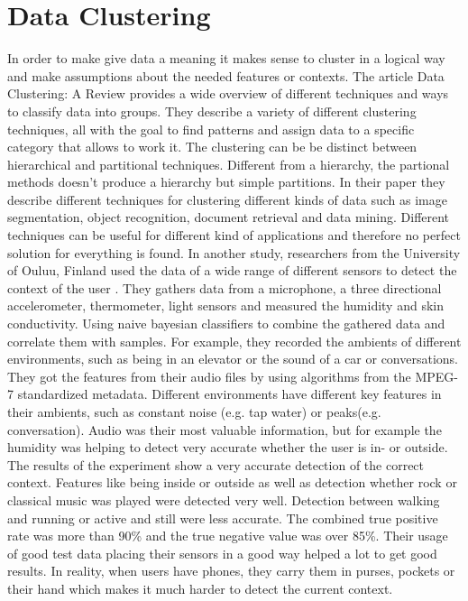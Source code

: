 \section{Data Clustering}
In order to make give data a meaning it makes sense to cluster in a logical way and make assumptions about the needed features or contexts. 
The article Data Clustering: A Review \cite{jain1999data} provides a wide overview of different techniques and ways to classify data into groups. They describe a variety of different clustering techniques, all with the goal to find patterns and assign data to a specific category that allows to work it. The clustering can be be distinct between hierarchical and partitional techniques. Different from a hierarchy, the partional methods doesn't produce a hierarchy but simple partitions. In their paper they describe different techniques for clustering different kinds of data such as image segmentation, object recognition, document retrieval and data mining. Different techniques can be useful for different kind of applications and therefore no perfect solution for everything is found. 
In another study, researchers from the University of Ouluu, Finland used the data of a wide range of different sensors to detect the context of the user \cite{korpipaa2003bayesian}. They gathers data from a microphone, a three directional accelerometer, thermometer, light sensors and measured the humidity and skin conductivity. 
Using naive bayesian classifiers to combine the gathered data and correlate them with samples. For example, they recorded the ambients of different environments, such as being in an elevator or the sound of a car or conversations. They got the features from their audio files by using algorithms from the MPEG-7 standardized metadata. Different environments have different key features in their ambients, such as constant noise (e.g. tap water) or peaks(e.g. conversation).
Audio was their most valuable information, but for example the humidity was helping to detect very accurate whether the user is in- or outside.
The results of the experiment show a very accurate detection of the correct context. Features like being inside or outside as well as detection whether rock or classical music was played were detected very well. Detection between walking and running or active and still were less accurate.
The combined true positive rate was more than 90\% and the true negative value was over 85\%. Their usage of good test data placing their sensors in a good way helped a lot to get good results. In reality, when users have phones, they carry them in purses, pockets or their hand which makes it much harder to detect the current context.
